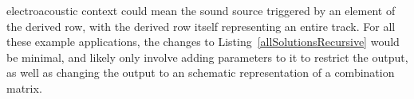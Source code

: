 electroacoustic context could mean the sound source triggered by an element of the derived row, with the derived row itself representing an entire track. For all these example applications, the changes to Listing~\ref{allSolutionsRecursive} would be minimal, and likely only involve adding parameters to it to restrict the output, as well as changing the output to an schematic representation of a combination matrix.
